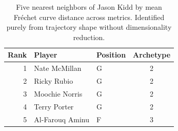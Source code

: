 \begin{table}[htbp]
  \centering\small
  \begin{tabular}{rllc}
    \toprule
    Rank & Player & Position & Archetype \\
    \midrule
    1 & Nate McMillan & G & 2 \\
    2 & Ricky Rubio & G & 2 \\
    3 & Moochie Norris & G & 2 \\
    4 & Terry Porter & G & 2 \\
    5 & Al-Farouq Aminu & F & 3 \\
    \bottomrule
  \end{tabular}
  \caption{Five nearest neighbors of Jason Kidd by mean Fr\'{e}chet curve distance across metrics. Identified purely from trajectory shape without dimensionality reduction.}
  \label{tab:Jason_Kidd_frechet_curve_neighbors}
\end{table}

